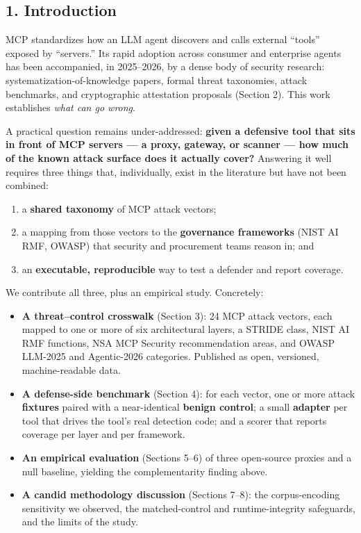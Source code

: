 \documentclass[
]{article}
\providecommand{\tightlist}{%
  \setlength{\itemsep}{0pt}\setlength{\parskip}{0pt}}
\begin{document}
\subsection{1. Introduction}\label{introduction}

MCP standardizes how an LLM agent discovers and calls external ``tools''
exposed by ``servers.'' Its rapid adoption across consumer and
enterprise agents has been accompanied, in 2025--2026, by a dense body
of security research: systematization-of-knowledge papers, formal threat
taxonomies, attack benchmarks, and cryptographic attestation proposals
(Section 2). This work establishes \emph{what can go wrong}.

A practical question remains under-addressed: \textbf{given a defensive
tool that sits in front of MCP servers --- a proxy, gateway, or scanner
--- how much of the known attack surface does it actually cover?}
Answering it well requires three things that, individually, exist in the
literature but have not been combined:

\begin{enumerate}
\def\labelenumi{\arabic{enumi}.}
\tightlist
\item
  a \textbf{shared taxonomy} of MCP attack vectors;
\item
  a mapping from those vectors to the \textbf{governance frameworks}
  (NIST AI RMF, OWASP) that security and procurement teams reason in;
  and
\item
  an \textbf{executable, reproducible} way to test a defender and report
  coverage.
\end{enumerate}

We contribute all three, plus an empirical study. Concretely:

\begin{itemize}
\tightlist
\item
  \textbf{A threat--control crosswalk} (Section 3): 24 MCP attack
  vectors, each mapped to one or more of six architectural layers, a
  STRIDE class, NIST AI RMF functions, NSA MCP Security recommendation
  areas, and OWASP LLM-2025 and Agentic-2026 categories. Published as
  open, versioned, machine-readable data.
\item
  \textbf{A defense-side benchmark} (Section 4): for each vector, one or
  more attack \textbf{fixtures} paired with a near-identical
  \textbf{benign control}; a small \textbf{adapter} per tool that drives
  the tool's real detection code; and a scorer that reports coverage per
  layer and per framework.
\item
  \textbf{An empirical evaluation} (Sections 5--6) of three open-source
  proxies and a null baseline, yielding the complementarity finding
  above.
\item
  \textbf{A candid methodology discussion} (Sections 7--8): the
  corpus-encoding sensitivity we observed, the matched-control and
  runtime-integrity safeguards, and the limits of the study.
\end{itemize}
\end{document}
